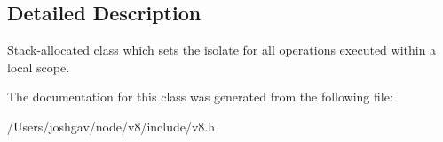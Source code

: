 \subsection{Detailed Description}
Stack-\/allocated class which sets the isolate for all operations executed within a local scope. 

The documentation for this class was generated from the following file\+:\begin{DoxyCompactItemize}
\item 
/\+Users/joshgav/node/v8/include/v8.\+h\end{DoxyCompactItemize}
